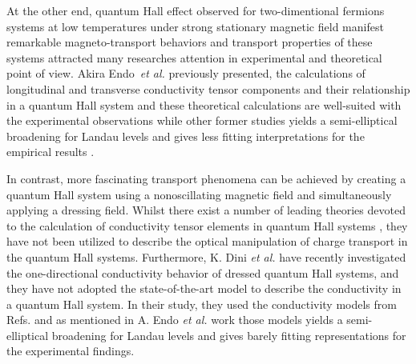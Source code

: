 At the other end, quantum Hall effect \cite{girvin90} observed for two-dimentional fermions systems at low temperatures under strong stationary magnetic field manifest remarkable magneto-transport behaviors and transport properties of these systems attracted many researches attention in experimental \cite{allerman95,tieke97,pan05} and theoretical \cite{ando72,ando74_1,ando74_2,ando74_3,ando74_4,ando82,endo09} point of view.
Akira Endo \textit{et al.} \cite{endo09} previously presented, the calculations of longitudinal and transverse conductivity tensor components and their relationship in a quantum Hall system and these theoretical calculations are well-suited with the experimental observations while other former studies yields a semi-elliptical broadening for Landau levels and gives less fitting interpretations for the empirical results \cite{endo09}.

In contrast, more fascinating transport phenomena can be achieved by creating a quantum Hall system using a nonoscillating magnetic field and simultaneously applying a dressing field.
Whilst there exist a number of leading theories devoted to the calculation of conductivity tensor elements in quantum Hall systems \cite{ando74_1,ando82,endo09}, they have not been utilized to describe the optical manipulation of charge transport in the quantum Hall systems.
Furthermore, K. Dini \textit{et al.} \cite{dini16} have recently investigated the one-directional conductivity behavior of dressed quantum Hall systems, and they have not adopted the state-of-the-art model to describe the conductivity in a quantum Hall system. In their study, they used the conductivity models from Refs. \cite{ando74_1,ando82} and as mentioned in A. Endo \textit{et al.} work \cite{endo09} those models yields a semi-elliptical broadening for Landau levels and gives barely fitting representations for the experimental findings.

